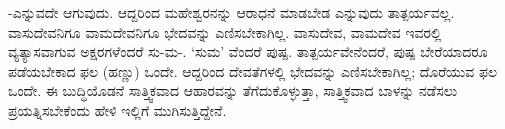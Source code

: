 -ಎನ್ನುವದೇ ಆಗುವುದು. ಆದ್ದರಿಂದ ಮಹೇಶ್ವರನನ್ನು ಆರಾಧನೆ ಮಾಡಬೇಡ ಎನ್ನುವುದು ತಾತ್ಪರ್ಯವಲ್ಲ. ವಾಸುದೇವನಿಗೂ ವಾಮದೇವನಿಗೂ ಭೇದವನ್ನು ಎಣಿಸಬೇಕಾಗಿಲ್ಲ. ವಾಸುದೇವ, ವಾಮದೇವ ಇವರಲ್ಲಿ ವ್ಯತ್ಯಾಸವಾಗುವ ಅಕ್ಷರಗಳೆಂದರೆ ಸು-ಮ-. `ಸುಮ' ವೆಂದರೆ ಪುಷ್ಪ. ತಾತ್ಪರ್ಯವೇನೆಂದರೆ, ಪುಷ್ಪ ಬೇರೆಯಾದರೂ ಪಡೆಯಬೇಕಾದ ಫಲ (ಹಣ್ಣು) ಒಂದೇ. ಆದ್ದರಿಂದ ದೇವತೆಗಳಲ್ಲಿ ಭೇದವನ್ನು ಎಣಿಸಬೇಕಾಗಿಲ್ಲ; ದೊರೆಯುವ ಫಲ ಒಂದೇ. ಈ ಬುದ್ಧಿಯೊಡನೆ ಸಾತ್ತ್ವಿಕವಾದ ಆಹಾರವನ್ನು ತೆಗೆದುಕೊಳ್ಳುತ್ತಾ, ಸಾತ್ತ್ವಿಕವಾದ ಬಾಳನ್ನು ನಡೆಸಲು ಪ್ರಯತ್ನಿಸಬೇಕೆಂದು ಹೇಳಿ ಇಲ್ಲಿಗೆ ಮುಗಿಸುತ್ತಿದ್ದೇನೆ.















































